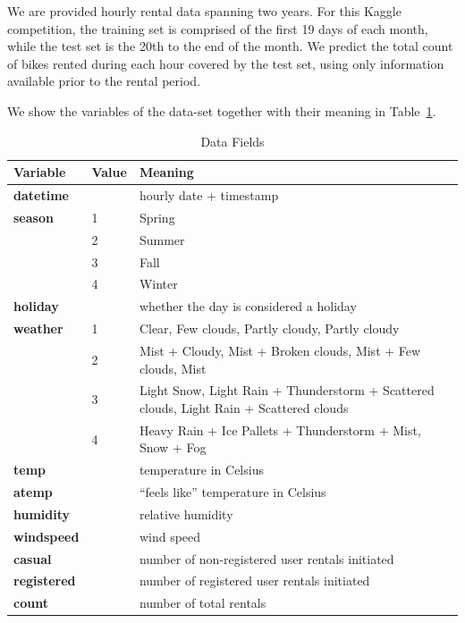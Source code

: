 \documentclass{article}
\begin{document}
We are provided hourly rental data spanning two years. For this Kaggle competition, the training set is comprised of the first 19 days of each month, while the test set is the 20th to the end of the month. We predict the total count of bikes rented during each hour covered by the test set, using only information available prior to the rental period.

We show the variables of the data-set together with their meaning in Table~\ref{tab:datafields}.

\begin{table}[t]
\begin{center}
\begin{tabular}{|llp{8cm}|}
\hline
\textbf{Variable} & \textbf{Value} & \textbf{Meaning}\\
\hline
\textbf{datetime} &  & hourly date + timestamp \\
\textbf{season} & 1 & Spring\\
 & 2 & Summer\\
 & 3 & Fall\\
 & 4 & Winter\\
\textbf{holiday} &  & whether the day is considered a holiday\\
\textbf{weather} & 1 & Clear, Few clouds, Partly cloudy, Partly cloudy\\
 & 2 & Mist + Cloudy, Mist + Broken clouds, Mist + Few clouds, Mist\\
 & 3 & Light Snow, Light Rain + Thunderstorm + Scattered clouds, Light Rain + Scattered clouds\\
 & 4 & Heavy Rain + Ice Pallets + Thunderstorm + Mist, Snow + Fog\\
\textbf{temp} &  & temperature in Celsius\\
\textbf{atemp} & & ``feels like'' temperature in Celsius\\
\textbf{humidity} & & relative humidity\\
\textbf{windspeed} & & wind speed\\
\textbf{casual} & & number of non-registered user rentals initiated\\
\textbf{registered} & & number of registered user rentals initiated\\
\textbf{count} & & number of total rentals\\
\hline
\end{tabular}
\caption{Data Fields}
\label{tab:datafields}
\end{center}
\end{table}
\end{document}

